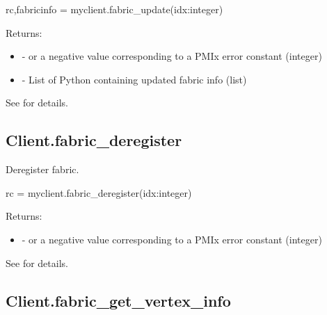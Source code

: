 \format

\pyspecificstart
\begin{codepar}
rc,fabricinfo = myclient.fabric_update(idx:integer)
\end{codepar}
\pyspecificend


\begin{arglist}
\end{arglist}

Returns:

\begin{itemize}
    \item {} -  or a negative value corresponding to a PMIx error constant (integer)
    \item {} - List of Python  containing updated fabric info (list)
\end{itemize}

See  for details.


\subsection{Client.fabric_deregister}

\summary
Deregister fabric.

\format

\pyspecificstart
\begin{codepar}
rc = myclient.fabric_deregister(idx:integer)
\end{codepar}
\pyspecificend


\begin{arglist}
\end{arglist}

Returns:

\begin{itemize}
    \item {} -  or a negative value corresponding to a PMIx error constant (integer)
\end{itemize}

See  for details.


\subsection{Client.fabric_get_vertex_info}

